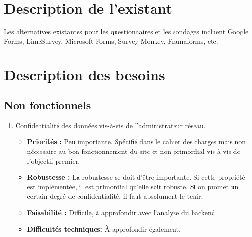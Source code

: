 \documentclass{article}
\begin{document}
\section{Description de l'existant}
Les alternatives existantes pour les questionnaires et les sondages incluent Google Forms, LimeSurvey, Microsoft Forms, Survey Monkey, Framaforms, etc.
\section{Description des besoins}
\subsection{Non fonctionnels}
\begin{enumerate}[noitemsep]
\item Confidentialité des données vis-à-vis de l'administrateur réseau.
\begin{itemize}[noitemsep]
\item \textbf{Priorités : }Peu importante. Spécifié dans le cahier des charges mais non nécessaire au bon fonctionnement du site et non primordial vis-à-vis de l'objectif premier.
\item \textbf{Robustesse : } La robustesse se doit d'être importante. Si cette propriété est implémentée, il est primordial qu'elle soit robuste. Si on promet un certain degré de confidentialité, il faut absolument le tenir.
\item \textbf{Faisabilité : } Difficile, à approfondir avec l'analyse du backend.
\item \textbf{Difficultés techniques: } À approfondir également.
\end{itemize}



\end{enumerate}
\end{document}
